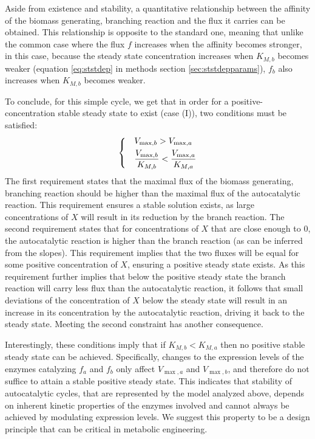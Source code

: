     Aside from existence and stability, a quantitative relationship between the affinity of the biomass generating, branching reaction and the flux it carries can be obtained.
    This relationship is opposite to the standard one, meaning that unlike the common case where the flux $f$ increases when the affinity becomes stronger, in this case, because the steady state concentration increases when $K_{M,b}$ becomes weaker (equation \ref{eq:ststdep} in methods section \ref{sec:ststdepparams}), $f_b$ also increases when $K_{M,b}$ becomes weaker.

    To conclude, for this simple cycle, we get that in order for a positive-concentration stable steady state to exist (case (I)), two conditions must be satisfied:
    \begin{equation}
    \label{eq:stabconds}
    \begin{dcases}
      & V_{\max,b}>V_{\max,a} \\
      & \frac{V_{\max,b}}{K_{M,b}}<\frac{V_{\max,a}}{K_{M,a}}
    \end{dcases}
    \end{equation}
    The first requirement states that the maximal flux of the biomass generating, branching reaction should be higher than the maximal flux of the autocatalytic reaction.
    This requirement ensures a stable solution exists, as large concentrations of $X$ will result in its reduction by the branch reaction.
    The second requirement states that for concentrations of $X$ that are close enough to $0$, the autocatalytic reaction is higher than the branch reaction (as can be inferred from the slopes).
    This requirement implies that the two fluxes will be equal for some positive concentration of $X$, ensuring a positive steady state exists.
    As this requirement further implies that below the positive steady state the branch reaction will carry less flux than the autocatalytic reaction, it follows that small deviations of the concentration of $X$ below the steady state will result in an increase in its concentration by the autocatalytic reaction, driving it back to the steady state.
    Meeting the second constraint has another consequence.

    Interestingly, these conditions imply that if $K_{M,b}<K_{M,a}$ then no positive stable steady state can be achieved.
    Specifically, changes to the expression levels of the enzymes catalyzing $f_a$ and $f_b$ only affect $V_{\max,a}$ and $V_{\max,b}$, and therefore do not suffice to attain a stable positive steady state.
    This indicates that stability of autocatalytic cycles, that are represented by the model analyzed above, depends on inherent kinetic properties of the enzymes involved and cannot always be achieved by modulating expression levels.
    We suggest this property to be a design principle that can be critical in metabolic engineering.

